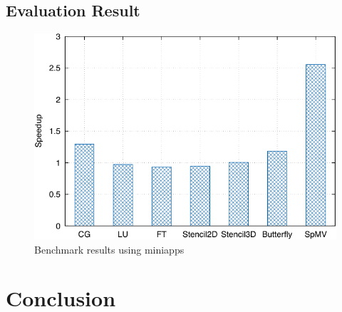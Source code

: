\documentclass[graybox]{svmult}
\begin{document}
\subsection{Evaluation Result}

\begin{figure}
    \centering
    \includegraphics{benchmark_result}
    \caption{Benchmark results using miniapps}%
    \label{kt:fig:benchmark}
\end{figure}

\section{Conclusion}\label{kt:sec:v}



\end{document}

